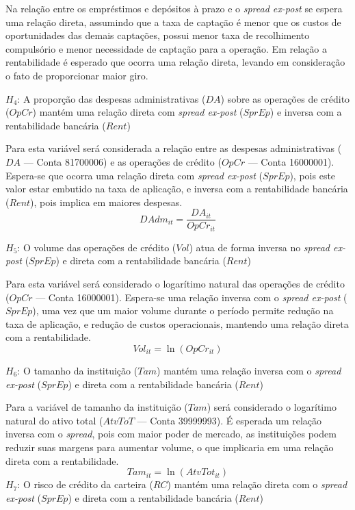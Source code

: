 \documentclass[12pt,12pt,openright,oneside,a4paper,chapter=TITLE,section=TITLE,subsection=TITLE,subsubsection=TITLE,english,french,spanish,portugues,sumario=tradicional]{abntex2}
\begin{document}
Na relação entre os empréstimos e depósitos à prazo e o \emph{spread ex-post} se espera uma relação direta, assumindo que a taxa de captação é menor que os custos de oportunidades das demais captações, possui menor taxa de recolhimento compulsório e menor necessidade de captação para a operação. Em relação a rentabilidade é esperado que ocorra uma relação direta, levando em consideração o fato de proporcionar maior giro.

\(H_{4}\): A proporção das despesas administrativas (\(DA\)) sobre as operações de crédito (\(OpCr\)) mantém uma relação direta com \emph{spread ex-post} (\(SprEp\)) e inversa com a rentabilidade bancária (\(Rent\))

Para esta variável será considerada a relação entre as despesas administrativas (\(DA\) --- Conta 81700006) e as operações de crédito (\(OpCr\) --- Conta 16000001). Espera-se que ocorra uma relação direta com \emph{spread ex-post} (\(SprEp\)), pois este valor estar embutido na taxa de aplicação, e inversa com a rentabilidade bancária (\(Rent\)), pois implica em maiores despesas.
\[
DAdm_{it} = \frac{DA_{it}}{OpCr_{it}}
\]

\(H_{5}\): O volume das operações de crédito (\(Vol\)) atua de forma inversa no \emph{spread ex-post} (\(SprEp\)) e direta com a rentabilidade bancária (\(Rent\))

Para esta variável será considerado o logarítimo natural das operações de crédito (\(OpCr\) --- Conta 16000001). Espera-se uma relação inversa com o \emph{spread ex-post} (\(SprEp\)), uma vez que um maior volume durante o período permite redução na taxa de aplicação, e redução de custos operacionais, mantendo uma relação direta com a rentabilidade.
\[
Vol_{it} = \ln(OpCr_{it})
\]

\(H_{6}\): O tamanho da instituição (\(Tam\)) mantém uma relação inversa com o \emph{spread ex-post} (\(SprEp\)) e direta com a rentabilidade bancária (\(Rent\))

Para a variável de tamanho da instituição (\(Tam\)) será considerado o logarítimo natural do ativo total (\(AtvToT\) --- Conta 39999993). É esperada um relação inversa com o \emph{spread}, pois com maior poder de mercado, as instituições podem reduzir suas margens para aumentar volume, o que implicaria em uma relação direta com a rentabilidade.
\[
Tam_{it} = \ln(AtvTot_{it})
\]
\(H_{7}\): O risco de crédito da carteira (\(RC\)) mantém uma relação direta com o \emph{spread ex-post} (\(SprEp\)) e direta com a rentabilidade bancária (\(Rent\))
\end{document}
